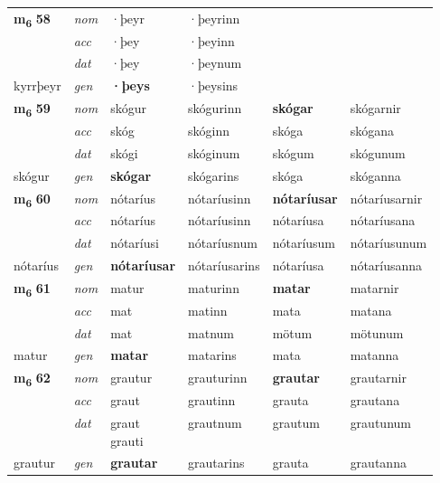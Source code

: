 \begin{longtable}[l]{X>{\footnotesize\itshape}XXXXX}
\multirow{3}{*}{{{\textbf{m{\textsubscript{6}}} \Large{\textbf{58}}}}}  
 & nom & ·þeyr & ·þeyrinn    & \textbf{} &   \\*
 & acc & ·þey  & ·þeyinn   &   &  \\*
 & dat & ·þey & ·þeynum   &  &  \\*
 {\footnotesize{kyrrþeyr}} &  gen & \textbf{·þeys}  & ·þeysins  &  &  \\
\cmidrule{1-6}


\multirow{3}{*}{{{\textbf{m{\textsubscript{6}}} \Large{\textbf{59}}}}}  
 & nom & skógur & skógurinn    & \textbf{skógar} & skógarnir  \\*
 & acc & skóg  & skóginn   & skóga  & skógana \\*
 & dat & skógi & skóginum   & skógum & skógunum \\*
 {\footnotesize{skógur}} &  gen & \textbf{skógar}  & skógarins  & skóga & skóganna \\
\cmidrule{1-6}


\multirow{3}{*}{{{\textbf{m{\textsubscript{6}}} \Large{\textbf{60}}}}}  
 & nom & nótaríus & nótaríusinn    & \textbf{nótaríusar} & nótaríusarnir  \\*
 & acc & nótaríus  & nótaríusinn   & nótaríusa  & nótaríusana \\*
 & dat & nótaríusi & nótaríusnum   & nótaríusum & nótaríusunum \\*
 {\footnotesize{nótaríus}} &  gen & \textbf{nótaríusar}  & nótaríusarins  & nótaríusa & nótaríusanna \\
\cmidrule{1-6}


\multirow{3}{*}{{{\textbf{m{\textsubscript{6}}} \Large{\textbf{61}}}}}  
 & nom & matur & maturinn    & \textbf{matar} & matarnir  \\*
 & acc & mat  & matinn   & mata  & matana \\*
 & dat & mat & matnum   & mötum & mötunum \\*
 {\footnotesize{matur}} &  gen & \textbf{matar}  & matarins  & mata & matanna \\
\cmidrule{1-6}


\multirow{3}{*}{{{\textbf{m{\textsubscript{6}}} \Large{\textbf{62}}}}}  
 & nom & grautur & grauturinn    & \textbf{grautar} & grautarnir  \\*
 & acc & graut  & grautinn   & grauta  & grautana \\*
 & dat & \specialcell{graut\\ grauti} & grautnum   & grautum & grautunum \\*
 {\footnotesize{grautur}} &  gen & \textbf{grautar}  & grautarins  & grauta & grautanna \\
\cmidrule{1-6}



\end{longtable}
